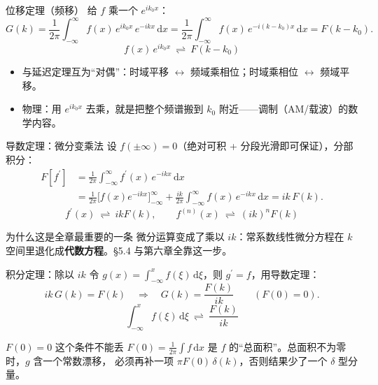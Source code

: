 \documentclass[aspectratio=169,10pt]{beamer}
\newcommand{\bhl}[1]{{\color{mid}\bfseries #1}}
\begin{document}
\begin{frame}{位移定理（频移）}
  {\small 给 $f$ 乘一个 $e^{ik_0x}$：}
  \[
    G(k)=\frac{1}{2\pi}\int_{-\infty}^{\infty}f(x)\,e^{ik_0x}\,e^{-ikx}\,\mathrm{d}x
    =\frac{1}{2\pi}\int_{-\infty}^{\infty}f(x)\,e^{-i(k-k_0)x}\,\mathrm{d}x
    =F(k-k_0).
  \]
  \[
    \boxed{\;f(x)\,e^{ik_0x}\ \rightleftharpoons\ F(k-k_0)\;}
  \]
  \begin{itemize}\small
    \item 与延迟定理互为“对偶”：时域平移 $\leftrightarrow$ 频域乘相位；时域乘相位 $\leftrightarrow$ 频域平移。
    \item 物理：用 $e^{ik_0x}$ 去乘，就是把整个频谱搬到 $k_0$ 附近——调制（AM/载波）的数学内容。
  \end{itemize}
\end{frame}

\begin{frame}{导数定理：微分变乘法}
  {\small 设 $f(\pm\infty)=0$（绝对可积 + 分段光滑即可保证），分部积分：}
  \begin{align*}
    F\!\left[f^{\prime}\right]
    &=\frac{1}{2\pi}\int_{-\infty}^{\infty}f^{\prime}(x)\,e^{-ikx}\,\mathrm{d}x\\
    &=\frac{1}{2\pi}\Big[f(x)e^{-ikx}\Big]_{-\infty}^{\infty}
      +\frac{ik}{2\pi}\int_{-\infty}^{\infty}f(x)\,e^{-ikx}\,\mathrm{d}x
     =ik\,F(k).
  \end{align*}
  \[
    \boxed{\;f^{\prime}(x)\ \rightleftharpoons\ ikF(k),\qquad f^{(n)}(x)\ \rightleftharpoons\ (ik)^{n}F(k)\;}
  \]
  \begin{block}{为什么这是全章最重要的一条}
    \small 微分运算变成了乘以 $ik$：常系数线性微分方程在 $k$ 空间里退化成\bhl{代数方程}。§5.4 与第六章全靠这一步。
  \end{block}
\end{frame}

\begin{frame}{积分定理：除以 $ik$}
  {\small 令 $g(x)=\int_{-\infty}^{x}f(\xi)\,\mathrm{d}\xi$，则 $g^{\prime}=f$，用导数定理：}
  \[
    ik\,G(k)=F(k)\quad\Longrightarrow\quad
    G(k)=\frac{F(k)}{ik}\qquad\left(F(0)=0\right).
  \]
  \[
    \boxed{\;\int_{-\infty}^{x}f(\xi)\,\mathrm{d}\xi\ \rightleftharpoons\ \frac{F(k)}{ik}\;}
  \]
  \begin{block}{$F(0)=0$ 这个条件不能丢}
    \small $F(0)=\frac{1}{2\pi}\int f\,\mathrm{d}x$ 是 $f$ 的“总面积”。总面积不为零时，$g$ 含一个常数漂移，
    必须再补一项 $\pi F(0)\,\delta(k)$，否则结果少了一个 $\delta$ 型分量。
  \end{block}
\end{frame}
\end{document}
